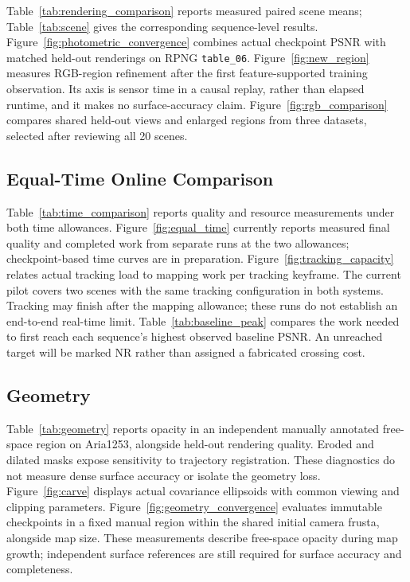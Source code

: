 Table~\ref{tab:rendering_comparison} reports measured paired scene means;
Table~\ref{tab:scene} gives the corresponding sequence-level results.
Figure~\ref{fig:photometric_convergence} combines actual checkpoint PSNR with
matched held-out renderings on RPNG \texttt{table\_06}.
Figure~\ref{fig:new_region} measures RGB-region refinement after the first
feature-supported training observation. Its axis is sensor time in a causal
replay, rather than elapsed runtime, and it makes no surface-accuracy claim.
Figure~\ref{fig:rgb_comparison} compares shared held-out views and enlarged
regions from three datasets, selected after reviewing all 20 scenes.






\subsection{Equal-Time Online Comparison}
\label{ssec:time_results}

Table~\ref{tab:time_comparison} reports quality and resource measurements
under both time allowances. Figure~\ref{fig:equal_time} currently reports measured final quality and completed work from separate runs at the two allowances; checkpoint-based time curves are in preparation.
Figure~\ref{fig:tracking_capacity} relates actual tracking load to mapping
work per tracking keyframe. The current pilot covers two scenes with the same
tracking configuration in both systems. Tracking may finish after the mapping
allowance; these runs do not establish an end-to-end real-time limit.
Table~\ref{tab:baseline_peak} compares the work needed to first reach each
sequence's highest observed baseline PSNR. An unreached target will be marked
NR rather than assigned a fabricated crossing cost.






\subsection{Geometry}
\label{ssec:geometry_results}

Table~\ref{tab:geometry} reports opacity in an independent manually annotated
free-space region on Aria1253, alongside held-out rendering quality.
Eroded and dilated masks expose sensitivity to trajectory registration.
These diagnostics do not measure dense surface accuracy or isolate the geometry loss.
Figure~\ref{fig:carve} displays actual covariance ellipsoids with common viewing and clipping parameters.
Figure~\ref{fig:geometry_convergence} evaluates immutable checkpoints in a fixed manual region within the shared initial camera frusta, alongside map size.
These measurements describe free-space opacity during map growth; independent surface references are still required for surface accuracy and completeness.

